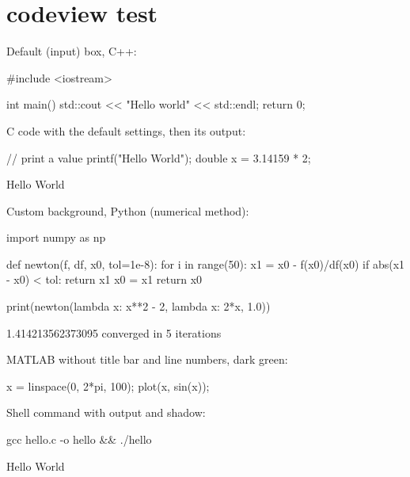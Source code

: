 \documentclass{article}
\begin{document}
\section*{codeview test}

Default (input) box, C++:
\begin{codeview}[input, name=helloworld.cpp]
#include <iostream>

int main() {
    std::cout << "Hello world" << std::endl;
    return 0;
}
\end{codeview}

C code with the default settings, then its output:
\begin{codeview}[input, lang=C]
// print a value
printf("Hello World");
double x = 3.14159 * 2;
\end{codeview}
\begin{codeview}[output]
Hello World
\end{codeview}

Custom background, Python (numerical method):
\begin{codeview}[input, bg=blue!50!black, lang=Python, name=newton.py]
import numpy as np

def newton(f, df, x0, tol=1e-8):
    for i in range(50):
        x1 = x0 - f(x0)/df(x0)
        if abs(x1 - x0) < tol:
            return x1
        x0 = x1
    return x0

print(newton(lambda x: x**2 - 2, lambda x: 2*x, 1.0))
\end{codeview}
\begin{codeview}[output, bg=blue!50!black, prompt=first]
1.414213562373095
converged in 5 iterations
\end{codeview}

MATLAB without title bar and line numbers, dark green:
\begin{codeview}[input, lang=Matlab, bg=green!30!black, nodots, nolinenos]
x = linspace(0, 2*pi, 100);
plot(x, sin(x)); %
\end{codeview}

Shell command with output and shadow:
\begin{codeview}[input, lang=bash, bg=red!40!black, shadow, name=terminal]
gcc hello.c -o hello && ./hello
\end{codeview}
\begin{codeview}[output, bg=red!40!black, prompt=none]
Hello World
\end{codeview}
\end{document}
